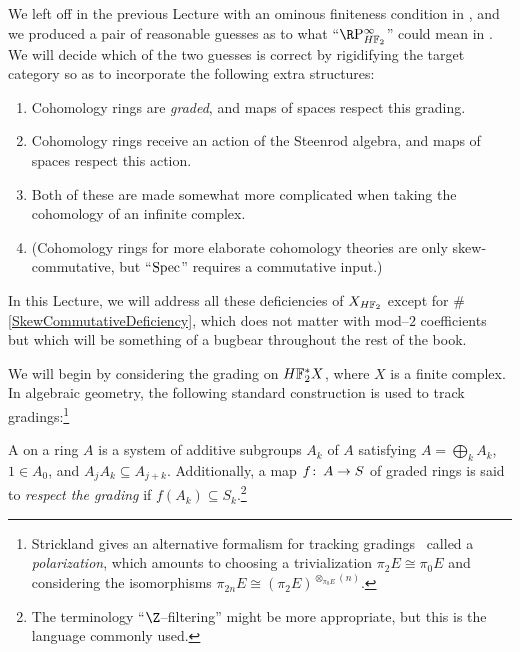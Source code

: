 We left off in the previous Lecture with an ominous finiteness condition in , and we produced a pair of reasonable guesses as to what ``\(\RP^\infty_{\HFtwo}\)'' could mean in .  We will decide which of the two guesses is correct by rigidifying the target category so as to incorporate the following extra structures:
\begin{enumerate}
\item Cohomology rings are \emph{graded}, and maps of spaces respect this grading.
\item Cohomology rings receive an action of the Steenrod algebra, and maps of spaces respect this action.
\item Both of these are made somewhat more complicated when taking the cohomology of an infinite complex.
\item \label{SkewCommutativeDeficiency} (Cohomology rings for more elaborate cohomology theories are only skew-commutative, but ``\(\operatorname{Spec}\)'' requires a commutative input.)
\end{enumerate}
In this Lecture, we will address all these deficiencies of \(X_{\HFtwo}\) except for \#\ref{SkewCommutativeDeficiency}, which does not matter with mod--\(2\) coefficients but which will be something of a bugbear throughout the rest of the book.

We will begin by considering the grading on \(\HFtwo^* X\), where \(X\) is a finite complex.  In algebraic geometry, the following standard construction is used to track gradings:\footnote{Strickland gives an alternative formalism for tracking gradings~\cite[Sections 11 and 14]{StricklandFPFP} called a \emph{polarization}, which amounts to choosing a trivialization \(\pi_2 E \cong \pi_0 E\) and considering the isomorphisms \(\pi_{2n} E \cong (\pi_2 E)^{\otimes_{\pi_0 E} (n)}\).}

\begin{definition}
A  on a ring \(A\) is a system of additive subgroups \(A_k\) of \(A\) satisfying \(A = \bigoplus_k A_k\), \(1 \in A_0\), and \(A_j A_k \subseteq A_{j+k}\).  Additionally, a map \(f\colon\thinspace A \to S\) of graded rings is said to \textit{respect the grading} if \(f(A_k) \subseteq S_k\).\footnote{The terminology ``\(\Z\)--filtering'' might be more appropriate, but this is the language commonly used.}
\end{definition}

